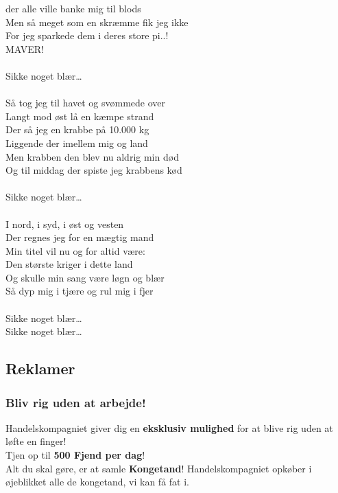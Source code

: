 \documentclass[letterpaper,12pt]{memoir}
\begin{document}
der alle ville banke mig til blods\\
Men så meget som en skræmme fik jeg ikke\\
For jeg sparkede dem i deres store pi..!\\
MAVER!\\
\\
Sikke noget blær…\\
\\
Så tog jeg til havet og svømmede over\\
Langt mod øst lå en kæmpe strand\\
Der så jeg en krabbe på 10.000 kg\\
Liggende der imellem mig og land\\
Men krabben den blev nu aldrig min død\\
Og til middag der spiste jeg krabbens kød\\
\\
Sikke noget blær…\\
\\
I nord, i syd, i øst og vesten\\
Der regnes jeg for en mægtig mand\\
Min titel vil nu og for altid være:\\
Den største kriger i dette land\\
Og skulle min sang være løgn og blær\\
Så dyp mig i tjære og rul mig i fjer\\
\\
Sikke noget blær…\\
Sikke noget blær…

\subsection*{Reklamer}

\subsubsection*{Bliv rig uden at arbejde!}

Handelskompagniet giver dig en \textbf{eksklusiv mulighed} for at blive rig uden at løfte en finger! \\[0.5em]

Tjen op til \textbf{500 Fjend per dag}! \\[0.5em]

Alt du skal gøre, er at samle \textbf{Kongetand}! Handelskompagniet opkøber i øjeblikket alle de kongetand, vi kan få fat i. \\[0.5em]
\end{document}
